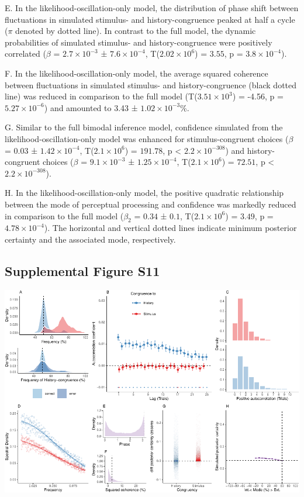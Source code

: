 \documentclass[
]{article}
\begin{document}
E. In the likelihood-oscillation-only model, the distribution of phase
shift between fluctuations in simulated stimulus- and history-congruence
peaked at half a cycle (\(\pi\) denoted by dotted line). In contrast to
the full model, the dynamic probabilities of simulated stimulus- and
history-congruence were positively correlated (\(\beta\) =
\(\ensuremath{2.7\times 10^{-3}}\) ± \(\ensuremath{7.6\times 10^{-4}}\),
T(\(\ensuremath{2.02\times 10^{6}}\)) = \(3.55\), p =
\(\ensuremath{3.8\times 10^{-4}}\)).

F. In the likelihood-oscillation-only model, the average squared
coherence between fluctuations in simulated stimulus- and
history-congruence (black dotted line) was reduced in comparison to the
full model (T(\ensuremath{3.51\times 10^{3}}) = -4.56, p =
\(\ensuremath{5.27\times 10^{-6}}\)) and amounted to 3.43 ±
\ensuremath{1.02\times 10^{-3}}\%.

G. Similar to the full bimodal inference model, confidence simulated
from the likelihood-oscillation-only model was enhanced for
stimulus-congruent choices (\(\beta\) = \(0.03\) ±
\(\ensuremath{1.42\times 10^{-4}}\),
T(\(\ensuremath{2.1\times 10^{6}}\)) = \(191.78\), p < \(\ensuremath{2.2\times 10^{-308}}\)) and
history-congruent choices (\(\beta\) =
\(\ensuremath{9.1\times 10^{-3}}\) ±
\(\ensuremath{1.25\times 10^{-4}}\),
T(\(\ensuremath{2.1\times 10^{6}}\)) = \(72.51\), p < \(\ensuremath{2.2\times 10^{-308}}\)).

H. In the likelihood-oscillation-only model, the positive quadratic
relationship between the mode of perceptual processing and confidence
was markedly reduced in comparison to the full model (\(\beta_2\) =
\(0.34\) ± \(0.1\), T(\(\ensuremath{2.1\times 10^{6}}\)) = \(3.49\), p =
\(\ensuremath{4.78\times 10^{-4}}\)). The horizontal and vertical dotted
lines indicate minimum posterior certainty and the associated mode,
respectively.

\newpage

\hypertarget{supplemental-figure-s11}{%
\subsection{Supplemental Figure S11}\label{supplemental-figure-s11}}

\includegraphics{modes_mouse_rev1b_clean_files/figure-latex/Supplemental_Figure_S11-1.pdf}
\end{document}
